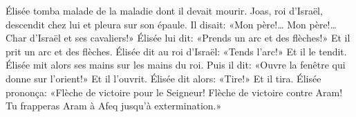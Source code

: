Élisée tomba malade de la maladie dont il devait mourir.
Joas, roi d’Israël, descendit chez lui et pleura sur son épaule.
	Il disait: «Mon père!… Mon père!… Char d’Israël et ses cavaliers!»
Élisée lui dit: «Prends un arc et des flèches!»
	Et il prit un arc et des flèches.
Élisée dit au roi d’Israël: «Tends l’arc!»
	Et il le tendit.
Élisée mit alors ses mains sur les mains du roi. Puis il dit:
	«Ouvre la fenêtre qui donne sur l’orient!»
	Et il l’ouvrit.
Élisée dit alors: «Tire!»
	Et il tira.
Élisée prononça: «Flèche de victoire pour le Seigneur!
	Flèche de victoire contre Aram! Tu frapperas Aram à Afeq jusqu’à extermination.»
